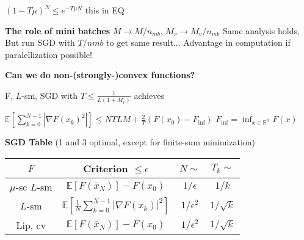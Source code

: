 $(1-T\mu)^N\le e^{-T\mu N}$ this  in EQ

\textbf{The role of mini batches}
$M\rightarrow{M/n_{mb}}$, $M_v \rightarrow{M_v/n_{mb}}$
Same analysis holds,
But run SGD with $T/n{mb}$ to get same result...
Advantage in computation if paralellization possible!

\textbf{Can we do non-(strongly-)convex functions? }

\begin{proposition}
	F, $L$-sm, SGD with
	$T\le \frac{1}{L(1+M_v)}$ achieves

	$\mathbb{E}[\sum_{k=0}^{N-1}|\nabla F(x_k)^2|]
		\le NTLM + \frac{2}{T}(F(x_0)-F_\text{inf})$
	$F_\text{inf} = \operatorname{inf}_{x\in\mathbb{R}^n}F(x)$
\end{proposition}


\textbf{SGD Table} (1 and 3 optimal, except for finite-sum minimization)
\begin{tabular}{|c|c|c|c|}
	\hline
	$F$             & Criterion                              $\leq \epsilon$       & $N \sim$       & $T_k \sim$   \\ \hline
	$\mu$-sc $L$-sm & $\mathbb{E}[F(\bar{x}_N)] - F(x_0)$                          & $1/\epsilon$   & $1/k$        \\ \hline
	$L$-sm          & $\mathbb{E}[\frac{1}{N} \sum_{k=0}^{N-1} |\nabla F(x_k)|^2]$ & $1/\epsilon^2$ & $1/\sqrt{k}$ \\ \hline
	Lip, cv         & $\mathbb{E}[F(\bar{x}_N)] - F(x_0) $                         & $1/\epsilon^2$ & $1/\sqrt{k}$ \\ \hline
\end{tabular}

